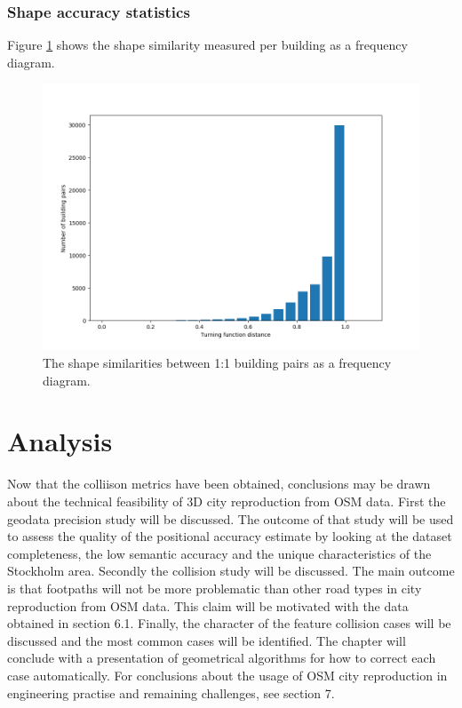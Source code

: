 \documentclass{kththesis}
\begin{document}
\subsubsection{Shape accuracy statistics}

Figure \ref{fig:bar-plot-similarity} shows the shape similarity measured per building as a frequency diagram.

\begin{figure}[H]
    \centering
    \includegraphics[width=\textwidth,height=0.5\textheight,keepaspectratio]{img_turning_function_plot}
    \caption{The shape similarities between 1:1 building pairs as a frequency diagram.}
    \label{fig:bar-plot-similarity}
\end{figure}

\section{Analysis}

Now that the colliison metrics have been obtained, conclusions may be drawn about the technical feasibility of 3D city reproduction from OSM data.
First the geodata precision study will be discussed.
The outcome of that study will be used to assess the quality of the positional accuracy estimate by looking at the dataset completeness, the low semantic accuracy and the unique characteristics of the Stockholm area.
Secondly the collision study will be discussed.
The main outcome is that footpaths will not be more problematic than other road types in city reproduction from OSM data.
This claim will be motivated with the data obtained in section 6.1.
Finally, the character of the feature collision cases will be discussed and the most common cases will be identified.
The chapter will conclude with a presentation of geometrical algorithms for how to correct each case automatically.
For conclusions about the usage of OSM city reproduction in engineering practise and remaining challenges, see section 7.
\end{document}
